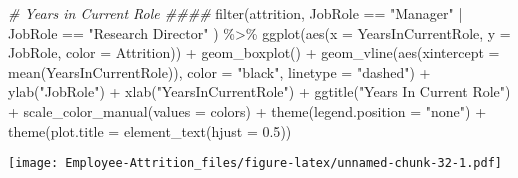 \documentclass[
]{article}
\newenvironment{Shaded}{\begin{snugshade}}{\end{snugshade}}
\newcommand{\AttributeTok}[1]{\textcolor[rgb]{0.77,0.63,0.00}{#1}}
\newcommand{\CommentTok}[1]{\textcolor[rgb]{0.56,0.35,0.01}{\textit{#1}}}
\newcommand{\FloatTok}[1]{\textcolor[rgb]{0.00,0.00,0.81}{#1}}
\newcommand{\FunctionTok}[1]{\textcolor[rgb]{0.00,0.00,0.00}{#1}}
\newcommand{\NormalTok}[1]{#1}
\newcommand{\SpecialCharTok}[1]{\textcolor[rgb]{0.00,0.00,0.00}{#1}}
\newcommand{\StringTok}[1]{\textcolor[rgb]{0.31,0.60,0.02}{#1}}
\begin{document}
\begin{Shaded}
\begin{Highlighting}[]
\CommentTok{\# Years in Current Role \#\#\#\#}
\FunctionTok{filter}\NormalTok{(attrition, JobRole }\SpecialCharTok{==} \StringTok{"Manager"} \SpecialCharTok{|}\NormalTok{ JobRole }\SpecialCharTok{==} \StringTok{"Research Director"}\NormalTok{ ) }\SpecialCharTok{\%\textgreater{}\%}
  \FunctionTok{ggplot}\NormalTok{(}\FunctionTok{aes}\NormalTok{(}\AttributeTok{x =}\NormalTok{ YearsInCurrentRole, }\AttributeTok{y =}\NormalTok{ JobRole, }\AttributeTok{color =}\NormalTok{ Attrition)) }\SpecialCharTok{+}
  \FunctionTok{geom\_boxplot}\NormalTok{() }\SpecialCharTok{+}
  \FunctionTok{geom\_vline}\NormalTok{(}\FunctionTok{aes}\NormalTok{(}\AttributeTok{xintercept =} \FunctionTok{mean}\NormalTok{(YearsInCurrentRole)), }\AttributeTok{color =} \StringTok{"black"}\NormalTok{, }\AttributeTok{linetype =} \StringTok{"dashed"}\NormalTok{) }\SpecialCharTok{+}
  \FunctionTok{ylab}\NormalTok{(}\StringTok{"JobRole"}\NormalTok{) }\SpecialCharTok{+}
  \FunctionTok{xlab}\NormalTok{(}\StringTok{"YearsInCurrentRole"}\NormalTok{) }\SpecialCharTok{+}
  \FunctionTok{ggtitle}\NormalTok{(}\StringTok{"Years In Current Role"}\NormalTok{) }\SpecialCharTok{+}
  \FunctionTok{scale\_color\_manual}\NormalTok{(}\AttributeTok{values =}\NormalTok{ colors) }\SpecialCharTok{+}
  \FunctionTok{theme}\NormalTok{(}\AttributeTok{legend.position =} \StringTok{"none"}\NormalTok{) }\SpecialCharTok{+}
  \FunctionTok{theme}\NormalTok{(}\AttributeTok{plot.title =} \FunctionTok{element\_text}\NormalTok{(}\AttributeTok{hjust =} \FloatTok{0.5}\NormalTok{)) }
\end{Highlighting}
\end{Shaded}

\texttt{[image: Employee-Attrition\_files/figure-latex/unnamed-chunk-32-1.pdf]}
\end{document}
